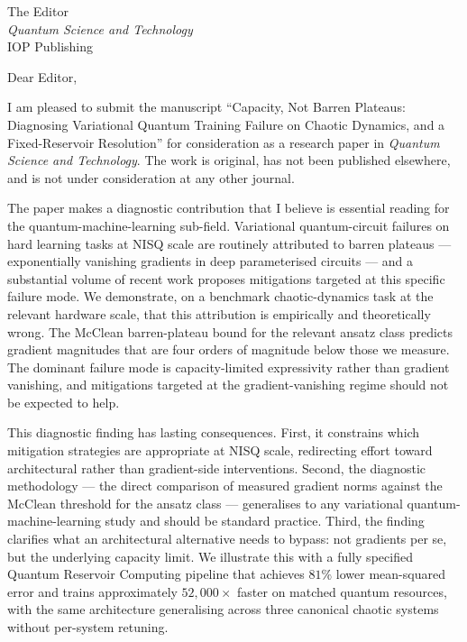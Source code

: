 \documentclass[11pt,a4paper]{letter}
\begin{document}
\begin{letter}{
  The Editor \\
  \textit{Quantum Science and Technology} \\
  IOP Publishing
}

\opening{Dear Editor,}

I am pleased to submit the manuscript ``Capacity, Not Barren Plateaus:
Diagnosing Variational Quantum Training Failure on Chaotic Dynamics, and
a Fixed-Reservoir Resolution'' for consideration as a research paper in
\textit{Quantum Science and Technology}. The work is original, has not
been published elsewhere, and is not under consideration at any other
journal.

The paper makes a diagnostic contribution that I believe is essential
reading for the quantum-machine-learning sub-field. Variational
quantum-circuit failures on hard learning tasks at NISQ scale are
routinely attributed to barren plateaus --- exponentially vanishing
gradients in deep parameterised circuits --- and a substantial volume
of recent work proposes mitigations targeted at this specific failure
mode. We demonstrate, on a benchmark chaotic-dynamics task at the
relevant hardware scale, that this attribution is empirically and
theoretically wrong. The McClean barren-plateau bound for the relevant
ansatz class predicts gradient magnitudes that are four orders of
magnitude below those we measure. The dominant failure mode is
capacity-limited expressivity rather than gradient vanishing, and
mitigations targeted at the gradient-vanishing regime should not be
expected to help.

This diagnostic finding has lasting consequences. First, it constrains
which mitigation strategies are appropriate at NISQ scale, redirecting
effort toward architectural rather than gradient-side interventions.
Second, the diagnostic methodology --- the direct comparison of
measured gradient norms against the McClean threshold for the ansatz
class --- generalises to any variational quantum-machine-learning
study and should be standard practice. Third, the finding clarifies
what an architectural alternative needs to bypass: not gradients per
se, but the underlying capacity limit. We illustrate this with a
fully specified Quantum Reservoir Computing pipeline that achieves
$81\%$ lower mean-squared error and trains approximately $52{,}000
\times$ faster on matched quantum resources, with the same
architecture generalising across three canonical chaotic systems
without per-system retuning.


\end{letter}
\end{document}
